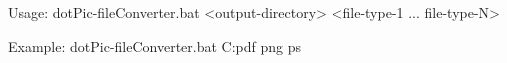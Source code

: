 Usage: dotPic-fileConverter.bat <output-directory> <file-type-1 ... file-type-N>

Example: dotPic-fileConverter.bat C:\Temp pdf png ps
